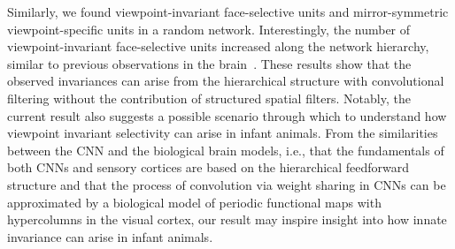 \documentclass[final,3p,times,twocolumn]{elsarticle}
\begin{document}
Similarly, we found viewpoint-invariant face-selective units and mirror-symmetric viewpoint-specific units in a random network.
Interestingly, the number of viewpoint-invariant face-selective units increased along the network hierarchy, similar to previous observations in the brain~\cite{freiwald2010functional}.
These results show that the observed invariances can arise from the hierarchical structure with convolutional filtering without the contribution of structured spatial filters.
Notably, the current result also suggests a possible scenario through which to understand how viewpoint invariant selectivity can arise in infant animals.
From the similarities between the CNN and the biological brain models, i.e., that the fundamentals of both CNNs and sensory cortices are based on the hierarchical feedforward structure and that the process of convolution via weight sharing in CNNs can be approximated by a biological model of periodic functional maps with hypercolumns in the visual cortex,
our result may inspire insight into how innate invariance can arise in infant animals.
\end{document}
